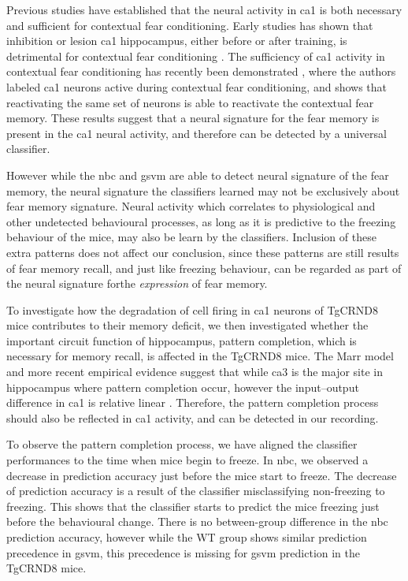 Previous studies have established that the neural activity in \gls{ca1} is both necessary and sufficient for contextual fear conditioning. Early studies has shown that inhibition or lesion \gls{ca1} hippocampus, either before or after training, is detrimental for contextual fear conditioning \citep{maren01}. The sufficiency of \gls{ca1} activity in contextual fear conditioning has recently been demonstrated \citep{ryan15, roy16}, where the authors labeled \gls{ca1} neurons active during contextual fear conditioning, and shows that reactivating the same set of neurons is able to reactivate the contextual fear memory. These results suggest that a neural signature for the fear memory is present in the \gls{ca1} neural activity, and therefore can be detected by a universal classifier. 

However while the \gls{nbc} and \gls{gsvm} are able to detect neural signature of the fear memory, the neural signature the classifiers learned may not be exclusively about fear memory signature. Neural activity which correlates to physiological and other undetected behavioural processes, as long as it is predictive to the freezing behaviour of the mice, may also be learn by the classifiers. Inclusion of these extra patterns does not affect our conclusion, since these patterns are still results of fear memory recall, and just like freezing behaviour, can be regarded as part of the neural signature forthe \textit{expression} of fear memory. 

To investigate how the degradation of cell firing in \gls{ca1} neurons of TgCRND8 mice contributes to their memory deficit, we then investigated whether the important circuit function of hippocampus, pattern completion, which is necessary for memory recall, is affected in the TgCRND8 mice. The Marr model and more recent empirical evidence \citep{rolls13, neunuebel14} suggest that while \gls{ca3} is the major site in hippocampus where pattern completion occur, however the input--output difference in \gls{ca1} is relative linear \citep{neunuebel14, knierim16}. Therefore, the pattern completion process should also be reflected in \gls{ca1} activity, and can be detected in our recording.

To observe the pattern completion process, we have aligned the classifier performances to the time when mice begin to freeze. In \gls{nbc}, we observed a decrease in prediction accuracy just before the mice start to freeze. The decrease of prediction accuracy is a result of the classifier misclassifying non-freezing to freezing. This shows that the classifier starts to predict the mice freezing just before the behavioural change. There is no between-group difference in the \gls{nbc} prediction accuracy, however while the WT group shows similar prediction precedence in \gls{gsvm}, this precedence is missing for \gls{gsvm} prediction in the TgCRND8 mice. 

